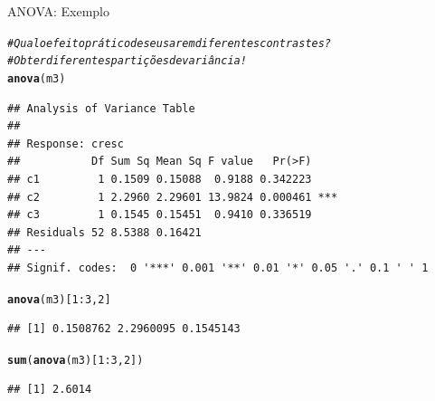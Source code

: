 \documentclass{beamer}\usepackage[]{graphicx}\usepackage[]{color}
\makeatletter
\newcommand{\hlnum}[1]{\textcolor[rgb]{0.686,0.059,0.569}{#1}}%
\newcommand{\hlcom}[1]{\textcolor[rgb]{0.678,0.584,0.686}{\textit{#1}}}%
\newcommand{\hlopt}[1]{\textcolor[rgb]{0,0,0}{#1}}%
\newcommand{\hlstd}[1]{\textcolor[rgb]{0.345,0.345,0.345}{#1}}%
\newcommand{\hlkwd}[1]{\textcolor[rgb]{0.737,0.353,0.396}{\textbf{#1}}}%
\newenvironment{kframe}{%
 \def\at@end@of@kframe{}%
 \ifinner\ifhmode%
  \def\at@end@of@kframe{\end{minipage}}%
  \begin{minipage}{\columnwidth}%
 \fi\fi%
 \def\FrameCommand##1{\hskip\@totalleftmargin \hskip-\fboxsep
 \colorbox{shadecolor}{##1}\hskip-\fboxsep
     \hskip-\linewidth \hskip-\@totalleftmargin \hskip\columnwidth}%
 \MakeFramed {\advance\hsize-\width
   \@totalleftmargin\z@ \linewidth\hsize
   \@setminipage}}%
 {\par\unskip\endMakeFramed%
 \at@end@of@kframe}
\newenvironment{knitrout}{}{} %
\renewenvironment{knitrout}{\setlength{\topsep}{0mm}}{}
\makeatother
\begin{document}
\begin{frame}[fragile]{ANOVA: Exemplo}

\begin{knitrout}\tiny
{}\color{fgcolor}\begin{kframe}
\begin{alltt}
\hlcom{# Qual o efeito prático de se usarem diferentes contrastes?}
\hlcom{# Obter diferentes partições de variância!}
\hlkwd{anova}\hlstd{(m3)}
\end{alltt}
\begin{verbatim}
## Analysis of Variance Table
## 
## Response: cresc
##           Df Sum Sq Mean Sq F value   Pr(>F)    
## c1         1 0.1509 0.15088  0.9188 0.342223    
## c2         1 2.2960 2.29601 13.9824 0.000461 ***
## c3         1 0.1545 0.15451  0.9410 0.336519    
## Residuals 52 8.5388 0.16421                     
## ---
## Signif. codes:  0 '***' 0.001 '**' 0.01 '*' 0.05 '.' 0.1 ' ' 1
\end{verbatim}
\begin{alltt}
\hlkwd{anova}\hlstd{(m3)[}\hlnum{1}\hlopt{:}\hlnum{3}\hlstd{,}\hlnum{2}\hlstd{]}
\end{alltt}
\begin{verbatim}
## [1] 0.1508762 2.2960095 0.1545143
\end{verbatim}
\begin{alltt}
\hlkwd{sum}\hlstd{(}\hlkwd{anova}\hlstd{(m3)[}\hlnum{1}\hlopt{:}\hlnum{3}\hlstd{,}\hlnum{2}\hlstd{])}
\end{alltt}
\begin{verbatim}
## [1] 2.6014
\end{verbatim}
\end{kframe}
\end{knitrout}

\end{frame}
\end{document}
